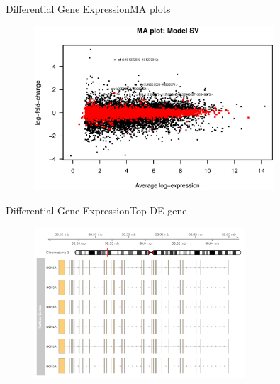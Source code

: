 \documentclass{beamer}
\begin{document}
\begin{frame}{Differential Gene Expression}{MA plots}

   \begin{figure}
        \includegraphics[width=0.8\textwidth,height=0.8\textheight,keepaspectratio]{MAplot.eps}
    \end{figure}

\end{frame}


\begin{frame}{Differential Gene Expression}{Top DE gene}

   \begin{figure}
        \includegraphics[width=0.7\textwidth,height=0.7\textheight,keepaspectratio]{SCN5A}
    \end{figure}

\end{frame}
\end{document}

